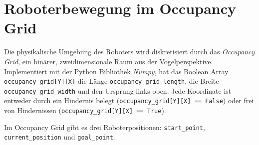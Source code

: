 \chapter{Roboterbewegung im Occupancy Grid} \label{ch:roboterbewegung}
Die physikalische Umgebung des Roboters wird diskretisiert durch das \textit{Occupancy Grid}, ein binärer, zweidimensionale Raum aus der Vogelperspektive. Implementiert mit der Python Bibliothek \textit{Numpy}, hat das Boolean Array \texttt{occupancy\_grid[Y][X]} die Länge \texttt{occupancy\_grid\_length}, die Breite \texttt{occupancy\_grid\_width} und den Ursprung links oben. Jede Koordinate ist entweder durch ein Hindernis belegt (\texttt{occupancy\_grid[Y][X] == False}) oder frei von Hindernissen (\texttt{occupancy\_grid[Y][X] == True}).

Im Occupancy Grid gibt es drei Roboterpositionen: \texttt{start\_point}, \texttt{current\_position} und \texttt{goal\_point}.
